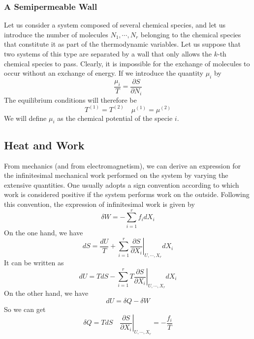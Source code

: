 \subsubsection{A Semipermeable Wall}
Let us consider a system composed of several chemical species, and let us introduce the number of molecules $N_1, \cdots, N_{r}$ belonging to the chemical species that constitute it as part of the thermodynamic variables. Let us suppose that two systems of this type are separated by a wall that only allows the $k$-th chemical species to pass. Clearly, it is impossible for the exchange of molecules to occur without an exchange of energy. If we introduce the quantity $\mu_i$ by
\[\frac{\mu_i}{T} =  \frac{\partial S}{\partial N_i} \]
The equilibrium conditions will therefore be
\[T^{(1)} = T^{(2)} \quad \mu^{(1)} = \mu^{(2)}\]
We will define $\mu_i$ as the chemical potential of the specie $i$.

\subsection{Heat and Work}
From mechanics (and from electromagnetism), we can derive an expression for the infinitesimal mechanical work performed on the system by varying the extensive quantities. One usually adopts a sign convention according to which work is considered positive if the system performs work on the outside. Following this convention, the expression of infinitesimal work is given by
\[\delta W  =  -\sum_{i = 1}^{r} f_i dX_i\]
On the one hand, we have
\[dS = \frac{dU}{T} + \sum_{i = 1}^{r} \left. \frac{\partial S}{\partial X_i} \right|_{U,\cdots,X_r} dX_i\]
It can be written as
\[dU = TdS - \sum_{i = 1}^{r} \left. T \frac{\partial S}{\partial X_i} \right|_{U,\cdots,X_r} dX_i\]
On the other hand, we have
\[dU = \delta Q - \delta W\]
So we can get
\[\delta Q = TdS \quad \left. \frac{\partial S}{\partial X_i} \right|_{U,\cdots,X_r} = - \frac{f_i}{T}\]

